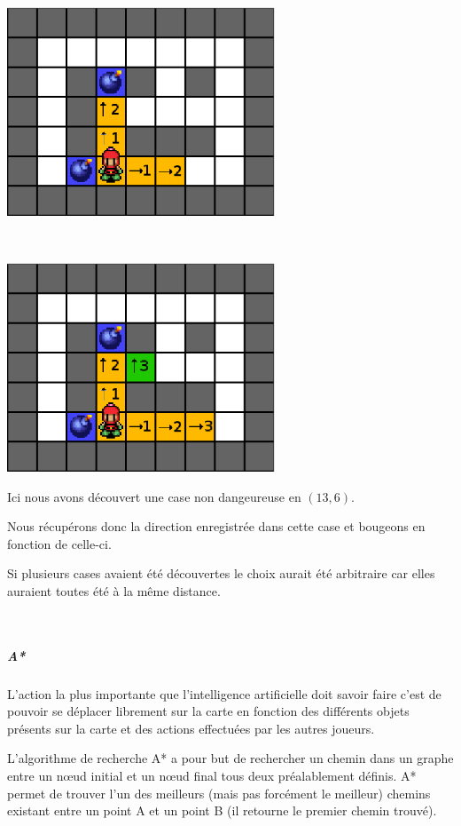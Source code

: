 			\begin{center}
				\includegraphics[width=8cm]{./Analyse/Img/largeur_3.eps}
				
				$\,$
				
				\includegraphics[width=8cm]{./Analyse/Img/largeur_4.eps}
			\end{center}
			
			Ici nous avons découvert une case non dangeureuse en $(13,6)$.
			
			Nous récupérons donc la direction enregistrée dans cette case et bougeons en fonction de celle-ci.
			
			Si plusieurs cases avaient été découvertes le choix aurait été arbitraire car elles auraient toutes été à la même distance.
			
			$\,$
			
		\subparagraph{A*\\}
		
			L'action la plus importante que l'intelligence artificielle doit savoir faire c'est de pouvoir se déplacer librement sur la carte en fonction des différents objets présents sur la carte et des actions effectuées par les autres joueurs.
		
			L'algorithme de recherche A* a pour but de rechercher un chemin
			dans un graphe entre un nœud initial et un nœud final tous deux préalablement
			définis. A* permet de trouver l'un des meilleurs (mais pas forcément le
			meilleur) chemins existant entre un point A et un point B (il retourne le premier chemin trouvé).
			
